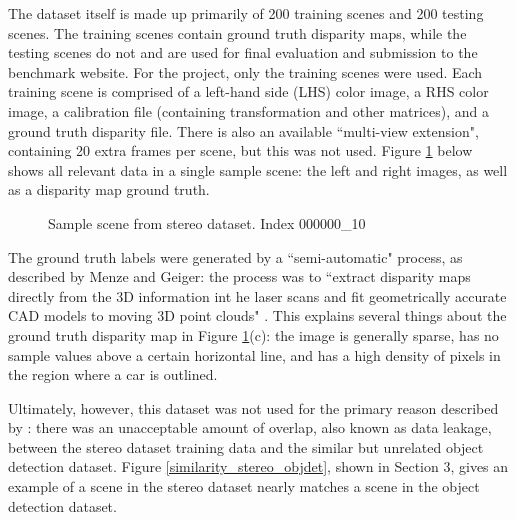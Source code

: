 The dataset itself is made up primarily of 200 training scenes and 200 testing scenes. The training scenes contain ground truth disparity maps, while the testing scenes do not and are used for final evaluation and submission to the benchmark website. For the project, only the training scenes were used. Each training scene is comprised of a left-hand side (LHS) color image, a RHS color image, a calibration file (containing transformation and other matrices), and a ground truth disparity file. There is also an available ``multi-view extension", containing 20 extra frames per scene, but this was not used. Figure \ref{stereo_sample} below shows all relevant data in a single sample scene: the left and right images, as well as a disparity map ground truth.

\begin{figure}[ht]
    \centering
    \caption{Sample scene from stereo dataset. Index 000000\_10}
    \label{stereo_sample}
\end{figure}

The ground truth labels were generated by a ``semi-automatic" process, as described by Menze and Geiger: the process was to ``extract disparity maps directly from the 3D information int he laser scans and fit geometrically accurate CAD models to moving 3D point clouds" \cite{menze_object_2015}. This explains several things about the ground truth disparity map in Figure \ref{stereo_sample}(c): the image is generally sparse, has no sample values above a certain horizontal line, and has a high density of pixels in the region where a car is outlined.

Ultimately, however, this dataset was not used for the primary reason described by \cite{wang_pseudo-lidar_2019}: there was an unacceptable amount of overlap, also known as data leakage, between the stereo dataset training data and the similar but unrelated object detection dataset. Figure \ref{similarity_stereo_objdet}, shown in Section 3, gives an example of a scene in the stereo dataset nearly matches a scene in the object detection dataset.


